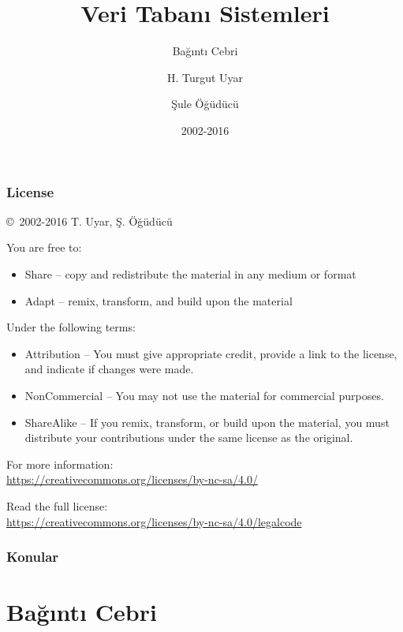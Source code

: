 \documentclass[dvipsnames]{beamer}
\title{Veri Tabanı Sistemleri}
\subtitle{Bağıntı Cebri}
\author{H. Turgut Uyar \and Şule Öğüdücü}
\date{2002-2016}
\theoremstyle{plain}
\begin{document}
\begin{frame}
  \titlepage
\end{frame}

\begin{frame}
  \frametitle{License}

  \hfill
  \copyright~2002-2016 T. Uyar, Ş. Öğüdücü

  \vfill
  \begin{footnotesize}
    You are free to:
    \begin{itemize}
      \itemsep0em
      \item Share -- copy and redistribute the material in any medium or format
      \item Adapt -- remix, transform, and build upon the material
    \end{itemize}

    Under the following terms:
    \begin{itemize}
      \itemsep0em
      \item Attribution -- You must give appropriate credit, provide a link to
        the license, and indicate if changes were made.

      \item NonCommercial -- You may not use the material for commercial
        purposes.

      \item ShareAlike -- If you remix, transform, or build upon the material,
        you must distribute your contributions under the same license as the
        original.
    \end{itemize}
  \end{footnotesize}

  \begin{small}
    For more information:\\
    \url{https://creativecommons.org/licenses/by-nc-sa/4.0/}

    \smallskip
    Read the full license:\\
    \url{https://creativecommons.org/licenses/by-nc-sa/4.0/legalcode}
  \end{small}
\end{frame}

\begin{frame}
  \frametitle{Konular}
  \tableofcontents
\end{frame}

\lstset{language=TutorialD}

\section{Bağıntı Cebri}
\end{document}
